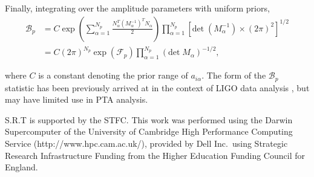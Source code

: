 \documentclass[twocolappendix,tighten]{emulateapj}
\begin{document}
Finally, integrating over the amplitude parameters with uniform priors,%
\begin{align}
\mathcal{B}_p &= C\exp\left(\sum_{\alpha=1}^{N_p}\frac{N_{\alpha}^T \left(M_{\alpha}^{-1}\right)^T N_{\alpha}}{2}\right)\prod_{\alpha=1}^{N_p}\left[\text{det}\;\left(M_{\alpha}^{-1}\right)\times \left(2\pi\right)^2\right]^{1/2} \nonumber\\
&= C\left(2\pi\right)^{N_p}\exp\left(\mathcal{F}_p\right) \prod_{\alpha=1}^{N_p} \left(\text{det}\;M_{\alpha}\right)^{-1/2},
\end{align}

where $C$ is a constant denoting the prior range of $a_{i\alpha}$. The form of the $\mathcal{B}_p$ statistic has been previously arrived at in the context of LIGO data analysis \citep{prix_bp}, but may have limited use in PTA analysis.







\acknowledgements
S.R.T is supported by the STFC. This work was performed using the Darwin Supercomputer of the University of Cambridge High Performance Computing Service (http://www.hpc.cam.ac.uk/), provided by Dell Inc.\ using Strategic Research Infrastructure Funding from the Higher Education Funding Council for England. 



\end{document}
